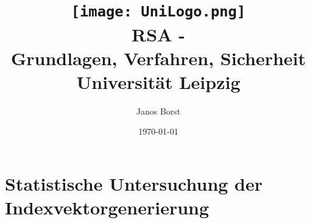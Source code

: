 \documentclass[12pt, oneside]{article}
\author{Janos Borst}
\title{
	{\texttt{[image: UniLogo.png]}}\\
	\bigskip
	\bigskip
	\bigskip
	\bf{RSA - \\Grundlagen, Verfahren, Sicherheit}\\
	\bigskip
	\bigskip
	{\large Universität Leipzig}\\}
\date{\today}
\begin{document}
% 
%

\section{Statistische Untersuchung der Indexvektorgenerierung}



	
\end{document}
